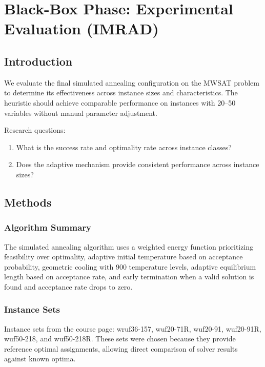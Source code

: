 \documentclass[11pt]{article}
\begin{document}
    \newpage


    \section{Black-Box Phase: Experimental Evaluation (IMRAD)}

    \subsection{Introduction}

    We evaluate the final simulated annealing configuration on the MWSAT problem
    to determine its effectiveness across instance sizes and characteristics.
    The heuristic should achieve comparable performance on instances with 20--50 variables
    without manual parameter adjustment.

    Research questions:
    \begin{enumerate}
        \item What is the success rate and optimality rate across instance classes?
        \item Does the adaptive mechanism provide consistent performance across instance sizes?
    \end{enumerate}

    \subsection{Methods}

    \subsubsection{Algorithm Summary}

    The simulated annealing algorithm uses a weighted energy function prioritizing feasibility
    over optimality, adaptive initial temperature based on acceptance probability, geometric
    cooling with 900 temperature levels, adaptive equilibrium length based on acceptance rate,
    and early termination when a valid solution is found and acceptance rate drops to zero.

    \subsubsection{Instance Sets}

    Instance sets from the course page: wruf36-157, wuf20-71R, wuf20-91, wuf20-91R, wuf50-218,
    and wuf50-218R. These sets were chosen because they provide reference optimal assignments,
    allowing direct comparison of solver results against known optima.
\end{document}
